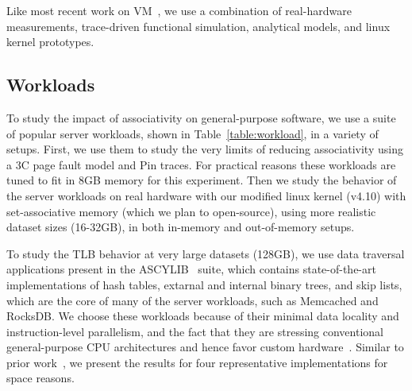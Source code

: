 Like most recent work on VM~\cite{basu:efficient, pham:increasing, pham:colt, bhattacharjee:large-reach, barr:spectlb, papadopoulou:prediction-based, saulsbury:recently-based}, we use a combination of real-hardware measurements, trace-driven functional simulation, analytical models, and linux kernel prototypes.

\subsection{Workloads}

To study the impact of associativity on general-purpose software, we use a suite of popular server workloads, shown in Table~\ref{table:workload}, in a variety of setups. First, we use them to study the very limits of reducing associativity using a 3C page fault model and Pin traces. For practical reasons these workloads are tuned to fit in 8GB memory for this experiment. Then we study the behavior of the server workloads on real hardware with our modified linux kernel (v4.10) with set-associative memory (which we plan to open-source), using more realistic dataset sizes (16-32GB), in both in-memory and out-of-memory setups.

To study the TLB behavior at very large datasets (128GB), we use  data traversal applications present in the ASCYLIB~\cite{david:asynchronized} suite, which contains state-of-the-art implementations of hash tables, extarnal and internal binary trees, and skip lists, which are the core of many of the server workloads, such as Memcached and RocksDB. We choose these workloads because of their minimal data locality and instruction-level parallelism, and the fact that they are stressing conventional general-purpose CPU architectures and hence favor custom hardware~\cite{ haria:devirtualizing, picorel:near-memory, kocberber:meet, hsieh:accelerating}. Similar to prior work~\cite{picorel:near-memory}, we present the results for four representative implementations for space reasons. 



